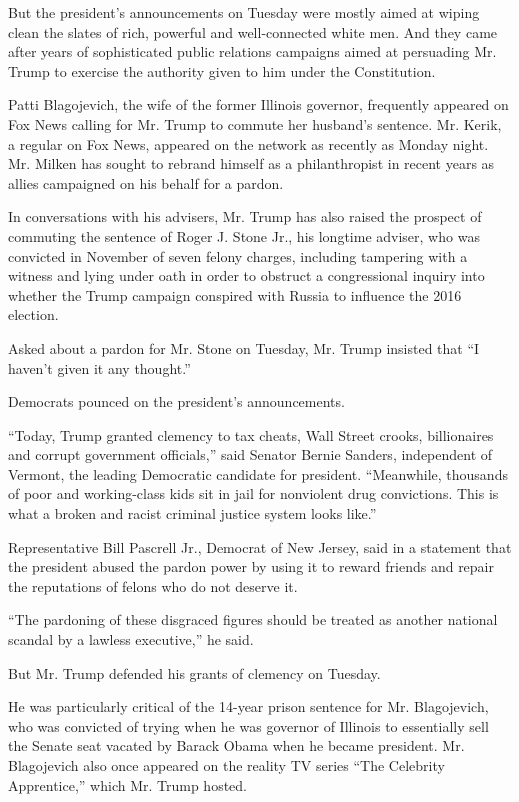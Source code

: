 But the president's announcements on Tuesday were mostly aimed at wiping
clean the slates of rich, powerful and well-connected white men. And
they came after years of sophisticated public relations campaigns aimed
at persuading Mr. Trump to exercise the authority given to him under the
Constitution.

Patti Blagojevich, the wife of the former Illinois governor, frequently
appeared on Fox News calling for Mr. Trump to commute her husband's
sentence. Mr. Kerik, a regular on Fox News, appeared on the network as
recently as Monday night. Mr. Milken has sought to rebrand himself as a
philanthropist in recent years as allies campaigned on his behalf for a
pardon.

In conversations with his advisers, Mr. Trump has also raised the
prospect of commuting the sentence of Roger J. Stone Jr., his longtime
adviser, who was convicted in November of seven felony charges,
including tampering with a witness and lying under oath in order to
obstruct a congressional inquiry into whether the Trump campaign
conspired with Russia to influence the 2016 election.

Asked about a pardon for Mr. Stone on Tuesday, Mr. Trump insisted that
``I haven't given it any thought.''

Democrats pounced on the president's announcements.

``Today, Trump granted clemency to tax cheats, Wall Street crooks,
billionaires and corrupt government officials,'' said Senator Bernie
Sanders, independent of Vermont, the leading Democratic candidate for
president. ``Meanwhile, thousands of poor and working-class kids sit in
jail for nonviolent drug convictions. This is what a broken and racist
criminal justice system looks like.''

Representative Bill Pascrell Jr., Democrat of New Jersey, said in a
statement that the president abused the pardon power by using it to
reward friends and repair the reputations of felons who do not deserve
it.

``The pardoning of these disgraced figures should be treated as another
national scandal by a lawless executive,'' he said.

But Mr. Trump defended his grants of clemency on Tuesday.

He was particularly critical of the 14-year prison sentence for Mr.
Blagojevich, who was convicted of trying when he was governor of
Illinois to essentially sell the Senate seat vacated by Barack Obama
when he became president. Mr. Blagojevich also once appeared on the
reality TV series ``The Celebrity Apprentice,'' which Mr. Trump hosted.

